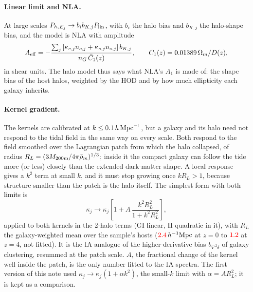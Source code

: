 \documentclass[11pt]{article}
\newcommand{\hMpc}{\,h\,{\rm Mpc}^{-1}}
\newcommand{\Plin}{P_{\rm lin}}
\newcommand{\Aeff}{A_{\rm eff}}
\newif\ifnumbersfinal
\newcommand{\refresh}[1]{\ifnumbersfinal#1\else\textcolor{red}{#1}\fi}
\begin{document}
\paragraph{Linear limit and NLA.} At large scales
$P_{h_iE_j}\to b_ib_{K,j}\Plin$, with $b_i$ the halo bias and $b_{K,j}$
the halo-shape bias, and the model is NLA with amplitude
\begin{equation}
\Aeff = -\frac{\sum_j\left[\kappa_{c,j}n_{c,j}+\kappa_{s,j}n_{s,j}\right]b_{K,j}}{n_G\,\bar C_1(z)},
\qquad \bar C_1(z) = 0.01389\,\Omega_m/D(z),
\end{equation}
in shear units. The halo model thus says what NLA's $A_1$ is made of: the
shape bias of the host halos, weighted by the HOD and by how much
ellipticity each galaxy inherits.

\paragraph{Kernel gradient.} The kernels are calibrated at $k\le0.1\hMpc$,
but a galaxy and its halo need not respond to the tidal field in the same
way on every scale. Both respond to the field smoothed over the Lagrangian
patch from which the halo collapsed, of radius
$R_L=(3M_{\rm 200m}/4\pi\bar\rho_m)^{1/3}$; inside it the compact galaxy
can follow the tide more (or less) closely than the extended dark-matter
shape. A local response gives a $k^2$ term at small $k$, and it must stop
growing once $kR_L>1$, because structure smaller than the patch is the
halo itself. The simplest form with both limits is
\begin{equation}
\kappa_j \to \kappa_j\left[1+A\,\frac{k^2R_L^2}{1+k^2R_L^2}\right],
\label{eq:grad}
\end{equation}
applied to both kernels in the 2-halo terms (GI linear, II quadratic in
it), with $R_L$ the galaxy-weighted mean over the sample's hosts
($\refresh{\RLHi}\,h^{-1}{\rm Mpc}$ at $z=0$ to $\refresh{\RLLo}$ at $z=4$,
not fitted). It is the IA analogue of the higher-derivative bias
$b_{\nabla^2\delta}$ of galaxy clustering, resummed at the patch scale.
$A$, the fractional change of the kernel well inside the patch, is the
only number fitted to the IA spectra. The first version of this note used
$\kappa_j\to\kappa_j(1+\alpha k^2)$, the small-$k$ limit with
$\alpha=AR_L^2$; it is kept as a comparison.
\end{document}
